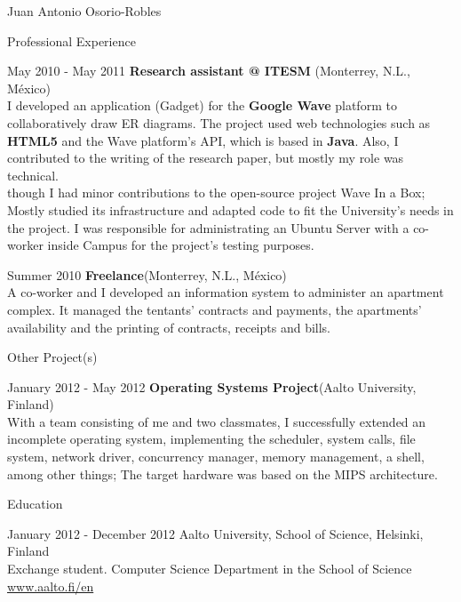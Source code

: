 \documentclass[english,11pt,letterpaper]{article}
\begin{document}
\begin{cv}{Juan Antonio Osorio-Robles}
\begin{cvlist}{Professional Experience}
		\item [May 2010 - May 2011]
            \textbf{Research assistant @ ITESM} (Monterrey, N.L., M\'{e}xico)\\
            I developed an application (Gadget) for the \textbf{Google Wave}
            platform to collaboratively draw ER diagrams. The project used web
            technologies such as \textbf{HTML5} and the Wave platform's API,
            which is based in \textbf{Java}. Also, I contributed to the
            writing of the research paper, but mostly my role was technical.\\

            though I had minor contributions to the open-source project Wave In
            a Box; Mostly studied its infrastructure and adapted code to fit
            the University's needs in the project. I was responsible for
            administrating an Ubuntu Server with a co-worker inside Campus for
            the project's testing purposes.

		\item [Summer 2010]
            \textbf{Freelance}(Monterrey, N.L., M\'{e}xico)\\
			A co-worker and I developed an information system to administer an
            apartment complex. It managed the tentants' contracts and payments,
            the apartments' availability and the printing of contracts,
            receipts and bills.
	\end{cvlist}

    \begin{cvlist}{Other Project(s)}
		\item [January 2012 - May 2012]
            \textbf{Operating Systems Project}(Aalto University, Finland)\\
            With a team consisting of me and two classmates, I successfully
            extended an incomplete operating system, implementing the scheduler,
            system calls, file system, network driver, concurrency manager,
            memory management, a shell, among other things; The target hardware
            was based on the MIPS architecture.
	\end{cvlist}

	\begin{cvlist}{Education}
		\item [January 2012 - December 2012]
			Aalto University, School of Science, Helsinki, Finland\\
			Exchange student. Computer Science Department in the School of
            Science\\
			\href{www.aalto.fi/en}{www.aalto.fi/en}


\end{cvlist}
\end{cv}
\end{document}

